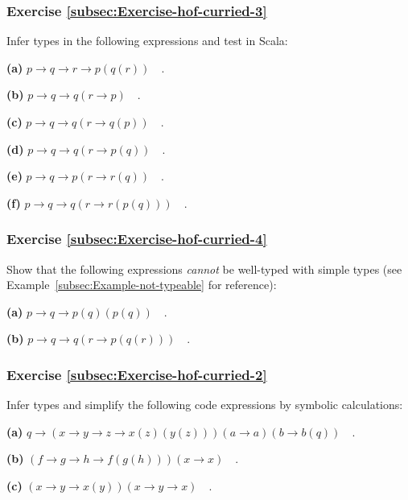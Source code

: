 \subsubsection{Exercise \label{subsec:Exercise-hof-curried-3}\ref{subsec:Exercise-hof-curried-3}}

Infer types in the following expressions and test in Scala:

\textbf{(a)} $p\rightarrow q\rightarrow r\rightarrow p(q(r))\quad.$

\textbf{(b)} $p\rightarrow q\rightarrow q(r\rightarrow p)\quad.$

\textbf{(c)} $p\rightarrow q\rightarrow q(r\rightarrow q(p))\quad.$

\textbf{(d)} $p\rightarrow q\rightarrow q(r\rightarrow p(q))\quad.$

\textbf{(e)} $p\rightarrow q\rightarrow p(r\rightarrow r(q))\quad.$

\textbf{(f)} $p\rightarrow q\rightarrow q(r\rightarrow r(p(q)))\quad.$

\subsubsection{Exercise \label{subsec:Exercise-hof-curried-4}\ref{subsec:Exercise-hof-curried-4}}

Show that the following expressions \emph{cannot} be well-typed with
simple types (see Example~\ref{subsec:Example-not-typeable} for
reference):

\textbf{(a)} $p\rightarrow q\rightarrow p(q)(p(q))\quad.$

\textbf{(b)} $p\rightarrow q\rightarrow q(r\rightarrow p(q(r)))\quad.$

\subsubsection{Exercise \label{subsec:Exercise-hof-curried-2}\ref{subsec:Exercise-hof-curried-2}}

Infer types and simplify the following code expressions by symbolic
calculations:

\textbf{(a)} $q\rightarrow\left(x\rightarrow y\rightarrow z\rightarrow x(z)(y(z))\right)\left(a\rightarrow a\right)\left(b\rightarrow b(q)\right)\quad.$

\textbf{(b)} $\left(f\rightarrow g\rightarrow h\rightarrow f(g(h))\right)(x\rightarrow x)\quad.$

\textbf{(c)} $\left(x\rightarrow y\rightarrow x(y)\right)\left(x\rightarrow y\rightarrow x\right)\quad.$

